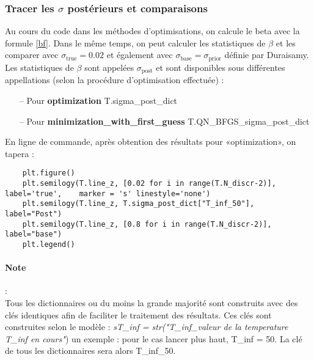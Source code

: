 \documentclass[a4paper,12pt]{article}
\newcommand\bk{\color{black}}
\newcommand\navy{\color{navy}}
\numberwithin{equation}{section} %
\begin{document}
\navy \subsubsection*{Tracer les $\sigma$ postérieurs et comparaisons} \bk
Au cours du code dans les méthodes d'optimisations, on calcule le beta avec la formule \eqref{bf}. Dans le même temps, on peut calculer les statistiques de $\beta$ et les comparer avec $\sigma_{\text{true}} = 0.02$ et également avec $\sigma_{\text{base}} = \sigma_{\text{prior}}$ définie par Duraisamy.\\
Les statistiques de $\beta$ sont appelées $\sigma_{\text{post}}$ et sont disponibles sous différentes appellations (selon la procédure d'optimisation effectuée) :
\begin{itemize}
\item[--] Pour \textbf{optimization} T.sigma\_post\_dict
\item[--] Pour \textbf{minimization\_with\_first\_guess} T.QN\_BFGS\_sigma\_post\_dict
\end{itemize}
En ligne de commande, après obtention des résultats pour «optimization», on tapera :
\begin{lstlisting}
	plt.figure()
	plt.semilogy(T.line_z, [0.02 for i in range(T.N_discr-2)], label='true', 	marker = 's' linestyle='none')
	plt.semilogy(T.line_z, T.sigma_post_dict["T_inf_50"], label="Post")
	plt.semilogy(T.line_z, [0.8 for i in range(T.N_discr-2)], label="base")
	plt.legend()
\end{lstlisting}

\paragraph*{Note} : \\
Tous les dictionnaires ou du moins la grande majorité sont construits avec des clés identiques afin de faciliter le traitement des résultats. Ces clés sont construites selon le modèle : \textit{sT\_inf = str("T\_inf\_\textit{valeur de la temperature T\_inf en cours}"}) un exemple :
pour le cas lancer plus haut, T\_inf = 50. La clé de tous les dictionnaires sera alors T\_inf\_50.\\



\pagebreak


\end{document}
